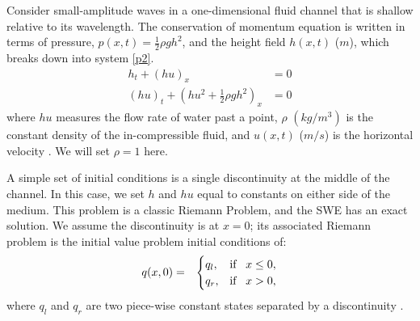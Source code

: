 \documentclass[11pt,a4paper]{article}
\begin{document}
		Consider small-amplitude waves in a one-dimensional fluid channel that is shallow relative to its wavelength. The conservation of momentum equation is written in terms of pressure, $p(x,t) = \frac{1}{2}\rho gh^{2}$, and the height field $h(x,t)$ ($m$), which breaks down into system \eqref{p2}.
	\begin{equation}
		\begin{aligned}
			h_{t} + (hu)_x &= 0 \\
			(hu)_t + \left(hu^{2} + \frac{1}{2}\rho gh^{2} \right)_x & = 0 
		\end{aligned}
		\label{p2}
	\end{equation}	
	where $hu$ measures the flow rate of water past a point,  $\rho$ $(kg/m^{3})$ is the constant density of the in-compressible fluid, and $u(x,t)$ ($m/s$) is the horizontal velocity  \cite{leveque2002finite,toro2001shock}.  We will set $\rho = 1$ here.
	
	A simple set of initial conditions is a single discontinuity at the middle of the channel.  In this case, we set $h$ and $hu$ equal to constants on either side of the medium.  This problem is a classic Riemann Problem, and the SWE has an exact solution.  We assume the discontinuity is at $x = 0$; its associated Riemann problem is the initial value problem initial conditions of:
		\begin{eqnarray}
		q(x,0)& =& \begin{cases}
			q_{l}, & \text{if \, $x \le 0,$}\\
			q_{r},& \text{if \, $x > 0,$}\\
			
		\end{cases}  
		\label{rp1}     
	\end{eqnarray}
where $q_{l}$ and $q_{r}$ are two piece-wise constant states separated by a discontinuity \cite{ba-le-mi-ro:2003}. 
\end{document}

